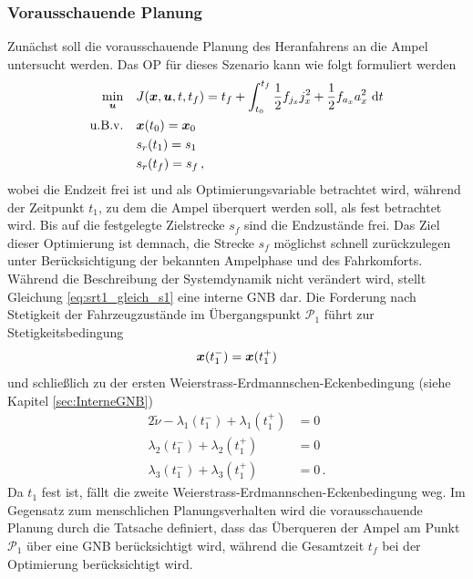 \subsubsection{Vorausschauende Planung}\label{subsubsec:Vorausschauend}
Zunächst soll die vorausschauende Planung des Heranfahrens an die Ampel untersucht werden. Das \gls{OP} für dieses Szenario kann wie folgt formuliert werden
\begin{align}
\min_{\boldsymbol{u}} \quad & J(\boldsymbol{x},\boldsymbol{u},t,t_f) = t_f + \int_{t_0}^{t_f}\frac{1}{2}f_{j_x} j_x^2 + \frac{1}{2}f_{a_x} a_x^2~\textrm{d}{t} \\
\textrm{u.B.v.} \quad& \boldsymbol{x}(t_0) = \boldsymbol{x}_0 \\
& s_r(t_1) = s_1 \label{eq:srt1_gleich_s1}\\
& s_r(t_f ) = s_f\,,
\end{align}
wobei die Endzeit frei ist und als Optimierungsvariable betrachtet wird, während der Zeitpunkt $t_1$, zu dem die Ampel überquert werden soll, als fest betrachtet wird. Bis auf die festgelegte Zielstrecke $s_f$ sind die Endzustände frei. Das Ziel dieser Optimierung ist demnach, die Strecke $s_f$ möglichst schnell zurückzulegen unter Berücksichtigung der bekannten Ampelphase und des Fahrkomforts. Während die Beschreibung der Systemdynamik nicht verändert wird, stellt Gleichung \eqref{eq:srt1_gleich_s1} eine interne \gls{GNB} dar. Die Forderung nach Stetigkeit der Fahrzeugzustände im Übergangspunkt $\mathcal{P}_1$ führt zur Stetigkeitsbedingung 
\begin{equation}
\boldsymbol{x}(t_1^-) = \boldsymbol{x}(t_1^+)
\end{equation}
und schließlich zu der ersten Weierstrass-Erdmannschen-Eckenbedingung (siehe Kapitel \ref{sec:InterneGNB})
\begin{align}
2\tilde{\nu} - \lambda_1(t_1^-) + \lambda_1(t_1^+) &= 0\\
\lambda_2(t_1^-) + \lambda_2(t_1^+) &= 0\\
\lambda_3(t_1^-) + \lambda_3(t_1^+) &= 0\,. \label{eq:l3tminus_l3tplus}
\end{align}
Da $t_1$ fest ist, fällt die zweite Weierstrass-Erdmannschen-Eckenbedingung weg. Im Gegensatz zum menschlichen Planungsverhalten wird die vorausschauende Planung durch die Tatsache definiert, dass das Überqueren der Ampel am Punkt $\mathcal{P}_1$ über eine \gls{GNB} berücksichtigt wird, während die Gesamtzeit $t_f$ bei der Optimierung berücksichtigt wird.

